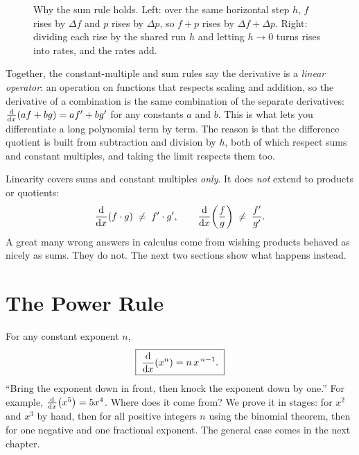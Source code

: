 \begin{figure}[H]
\caption{Why the sum rule holds. Left: over the same horizontal step $h$, $f$ rises by
$\Delta f$ and $p$ rises by $\Delta p$, so $f+p$ rises by $\Delta f+\Delta p$. Right:
dividing each rise by the shared run $h$ and letting $h\to 0$ turns rises into rates,
and the rates add.}
\label{ch11:fig-sum}
\end{figure}

\begin{whybox}
Together, the constant-multiple and sum rules say the derivative is a \emph{linear
operator}: an operation on functions that respects scaling and addition, so the
derivative of a combination is the same combination of the separate derivatives:
$\frac{\mathrm{d}}{\mathrm{d} x}\!\left(a f + b g\right) = a f' + b g'$ for any constants $a$ and $b$. This is what lets you
differentiate a long polynomial term by term. The reason is that the difference
quotient is built from subtraction and division by $h$, both of which respect sums and
constant multiples, and taking the limit respects them too.
\end{whybox}

\begin{trapbox}
Linearity covers sums and constant multiples \emph{only}. It does \emph{not} extend to
products or quotients:
\[
  \frac{\mathrm{d}}{\mathrm{d} x}\!\left(f\cdot g\right)\;\ne\; f'\cdot g',
  \qquad
  \frac{\mathrm{d}}{\mathrm{d} x}\!\left(\frac{f}{g}\right)\;\ne\;\frac{f'}{g'}.
\]
A great many wrong answers in calculus come from wishing products behaved as nicely as
sums. They do not. The next two sections show what happens instead.
\end{trapbox}

\section{The Power Rule}
\label{ch11:power-rule}

For any constant exponent $n$,
\[
  \boxed{\;\frac{\mathrm{d}}{\mathrm{d} x}\!\left(x^n\right) = n\,x^{\,n-1}.\;}
\]
``Bring the exponent down in front, then knock the exponent down by one.'' For example,
$\frac{\mathrm{d}}{\mathrm{d} x}\!\left(x^5\right) = 5x^4$. Where does it come from? We prove it in stages: for $x^2$ and
$x^3$ by hand, then for all positive integers $n$ using the binomial theorem, then for
one negative and one fractional exponent. The general case comes in the next chapter.

